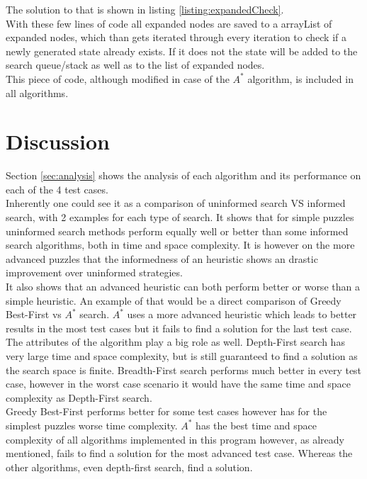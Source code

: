 \documentclass[journal]{IEEEtran}
\begin{document}
The solution to that is shown in listing \ref{listing:expandedCheck}. \\
With these few lines of code all expanded nodes are saved to a arrayList of expanded nodes, which than gets iterated through every iteration to check if a newly generated state already exists. If it does not the state will be added to the search queue/stack as well as to the list of expanded nodes. \\
This piece of code, although modified in case of the $A^*$ algorithm, is included in all algorithms. 

\section{Discussion}
Section \ref{sec:analysis} shows the analysis of each algorithm and its performance on each of the 4 test cases. \\
Inherently one could see it as a comparison of uninformed search VS informed search, with 2 examples for each type of search. It shows that for simple puzzles uninformed search methods perform equally well or better than some informed search algorithms, both in time and space complexity. It is however on the more advanced puzzles that the informedness of an heuristic shows an drastic improvement over uninformed strategies. \\
It also shows that an advanced heuristic can both perform better or worse than a simple heuristic. An example of that would be a direct comparison of Greedy Best-First vs $A^*$ search. $A^*$ uses a more advanced heuristic which leads to better results in the most test cases but it fails to find a solution for the last test case. \\ 
 
The attributes of the algorithm play a big role as well. Depth-First search has very large time and space complexity, but is still guaranteed to find a solution as the search space is finite. Breadth-First search performs much better in every test case, however in the worst case scenario it would have the same time and space complexity as Depth-First search.\\ 
Greedy Best-First performs better for some test cases however has for the simplest puzzles worse time complexity. $A^*$ has the best time and space complexity of all algorithms implemented in this program however, as already mentioned, fails to find a solution for the most advanced test case. Whereas the other algorithms, even depth-first search, find a solution. 
\end{document}
